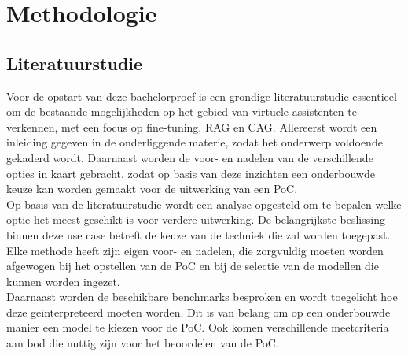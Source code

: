 
\chapter{Methodologie}
\label{ch:methodologie}


\section{Literatuurstudie}

Voor de opstart van deze bachelorproef is een grondige literatuurstudie essentieel om de bestaande mogelijkheden op het gebied van virtuele assistenten te verkennen, met een focus op fine-tuning, RAG en CAG. Allereerst wordt een inleiding gegeven in de onderliggende materie, zodat het onderwerp voldoende gekaderd wordt. Daarnaast worden de voor- en nadelen van de verschillende opties in kaart gebracht, zodat op basis van deze inzichten een onderbouwde keuze kan worden gemaakt voor de uitwerking van een PoC.
\\[1em]
Op basis van de literatuurstudie wordt een analyse opgesteld om te bepalen welke optie het meest geschikt is voor verdere uitwerking. De belangrijkste beslissing binnen deze use case betreft de keuze van de techniek die zal worden toegepast. Elke methode heeft zijn eigen voor- en nadelen, die zorgvuldig moeten worden afgewogen bij het opstellen van de PoC en bij de selectie van de modellen die kunnen worden ingezet.
\\[1em]
Daarnaast worden de beschikbare benchmarks besproken en wordt toegelicht hoe deze geïnterpreteerd moeten worden. Dit is van belang om op een onderbouwde manier een model te kiezen voor de PoC. Ook komen verschillende meetcriteria aan bod die nuttig zijn voor het beoordelen van de PoC.


